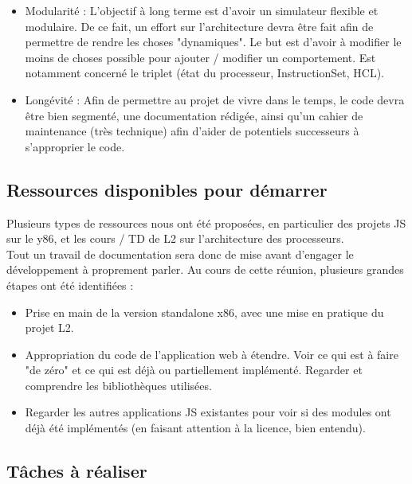 \documentclass[french]{article}
\begin{document}
\begin{itemize}
    \item Modularité : 
    L'objectif à long terme est d'avoir un simulateur flexible et modulaire. De ce fait, un effort sur l'architecture devra être fait afin de permettre de rendre les choses "dynamiques". Le but est d'avoir à modifier le moins de choses possible pour ajouter / modifier un comportement. Est notamment concerné le triplet (état du processeur, InstructionSet, HCL).
    
    \item Longévité : 
    Afin de permettre au projet de vivre dans le temps, le code devra être bien segmenté, une documentation rédigée, ainsi qu'un cahier de maintenance (très technique) afin d'aider de potentiels successeurs à s'approprier le code.
    
\end{itemize}

\subsection{Ressources disponibles pour démarrer}

Plusieurs types de ressources nous ont été proposées, en particulier des projets JS sur le y86, et les cours / TD de L2 sur l'architecture des processeurs.\\
Tout un travail de documentation sera donc de mise avant d'engager le développement à proprement parler. Au cours de cette réunion, plusieurs grandes étapes ont été identifiées : 

\begin{itemize}
    \item Prise en main de la version standalone x86, avec une mise en pratique du projet L2.
    
    \item Appropriation du code de l'application web à étendre. Voir ce qui est à faire "de zéro" et ce qui est déjà ou partiellement implémenté. Regarder et comprendre les bibliothèques utilisées.
    
    \item Regarder les autres applications JS existantes pour voir si des modules ont déjà été implémentés (en faisant attention à la licence, bien entendu).
\end{itemize}

\subsection{Tâches à réaliser}
\end{document}
